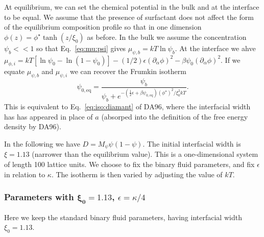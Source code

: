 At equilibrium, we can set the chemical potential in the bulk and
at the interface to be equal. We assume that the presence of
surfactant does not affect the form of the equilibrium
composition profile so that in one dimension
$\phi(z) = \phi^\star \tanh(z/\xi_0)$ as before.
In the bulk we assume the concentration $\psi_b << 1$ so that
Eq.~\ref{eq:mu:psi} gives $\mu_{\psi,b} = kT\ln \psi_b$. At
the interface we ahve $\mu_{\phi,i} = kT[\ln\psi_0 - \ln(1 - \psi_0)]
- (1/2)\epsilon(\partial_\alpha \phi)^2
- \beta\psi_0 (\partial_\alpha \phi)^2$.
If we equate $\mu_{\psi, b}$ and $\mu_{\psi,i}$ we can recover the
Frumkin isotherm
\begin{equation}
\psi_{0,\mathrm{eq}} = \frac{\psi_b}{\psi_b +
e^{-({\scriptscriptstyle \frac{1}{2}}\epsilon + \beta\psi_{0,\mathrm{eq}})
(\phi^\star)^2 / \xi_0^2 kT}}.
\end{equation}
This is equivalent to Eq.~\ref{eq:iso:diamant} of DA96, where the
interfacial width has has appeared in place of $a$ (absorped into
the definition of the free energy density by DA96).


In the following we have $D = M_\psi \psi ( 1 - \psi)$. The
initial interfacial width is $\xi = 1.13$ (narrower than the
equilibrium value). This is a one-dimensional system of
length 100 lattice units. We choose to fix the binary fluid
parameters, and fix $\epsilon$ in relation to $\kappa$. The
isotherm is then varied by adjusting the value of $kT$.

\subsubsection{Parameters with $\mathbf{\xi_0 = 1.13}$, $\epsilon = \kappa/4$}

Here we keep the standard binary fluid parameters, having interfacial
width $\xi_0 = 1.13$.

